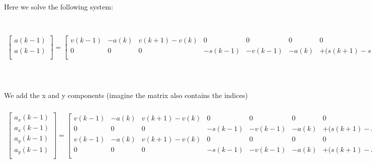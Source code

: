 \documentclass[10pt]{article}         %
\begin{document}
Here we solve the following system:
\begin{align}
    \begin{bmatrix}
        a(k-1) \\ 
        a(k-1) \\ 
    \end{bmatrix}
    =
    \begin{bmatrix}
        v(k-1)   & - a(k) &  v(k+1) - v(k) & 0 & 0 & 0 & 0          \\
        0 & 0 & 0 & - s(k-1) & - v(k-1) & -  a(k)  &+ \bigl( s(k+1) - s(k) - dt \  v(k) \bigr)   \\
    \end{bmatrix}
    \begin{bmatrix}
        \overline c_0 \\
        \overline c_1 \\
        \overline c_2 \\
        \overline c_3 \\
        \overline c_4 \\
        \overline c_5 \\
        \overline c_6 \\
   \end{bmatrix}
\end{align}

We add the x and y components (imagine the matrix also contains the indices)
\begin{align}
    \begin{bmatrix}
        a_x(k-1) \\ 
        a_x(k-1) \\ 
        a_y(k-1) \\ 
        a_y(k-1) \\ 
    \end{bmatrix}
    =
    \begin{bmatrix}
        v(k-1)   & - a(k) &  v(k+1) - v(k) & 0 & 0 & 0 & 0          \\
        0 & 0 & 0 & - s(k-1) & - v(k-1) & -  a(k)  &+ \bigl( s(k+1) - s(k) - dt \  v(k) \bigr)   \\
        v(k-1)   & - a(k) &  v(k+1) - v(k) & 0 & 0 & 0 & 0          \\
        0 & 0 & 0 & - s(k-1) & - v(k-1) & -  a(k)  &+ \bigl( s(k+1) - s(k) - dt \  v(k) \bigr)   \\
    \end{bmatrix}
    \begin{bmatrix}
        \overline c_0 \\
        \overline c_1 \\
        \overline c_2 \\
        \overline c_3 \\
        \overline c_4 \\
        \overline c_5 \\
        \overline c_6 \\
   \end{bmatrix}
\end{align}
\end{document}
